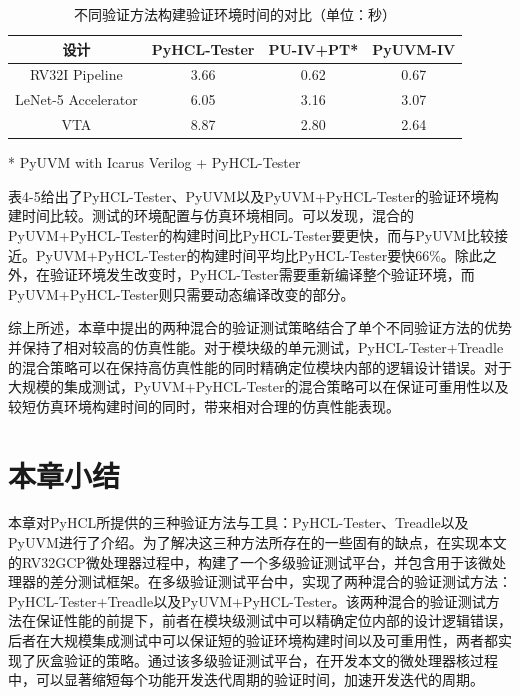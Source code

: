 \begin{table}
	\caption{不同验证方法构建验证环境时间的对比（单位：秒）}
	\centering
	\begin{tabular}{cccc}
		\toprule
		设计 & PyHCL-Tester & PU-IV+PT* & PyUVM-IV \\
		\midrule
		RV32I Pipeline & 3.66  & 0.62 & 0.67  \\
		LeNet-5 Accelerator & 6.05  & 3.16 & 3.07  \\
		VTA   & 8.87  & 2.80 & 2.64  \\
		\bottomrule
	\end{tabular}%
	
	\begin{threeparttable}
		\begin{tablenotes}
			\linespread{1.4}
			\footnotesize
			\item[*] PyUVM with Icarus Verilog + PyHCL-Tester
		\end{tablenotes}
	\end{threeparttable}
\end{table}%

表4-5给出了PyHCL-Tester、PyUVM以及PyUVM+PyHCL-Tester的验证环境构建时间比较。测试的环境配置与仿真环境相同。可以发现，混合的PyUVM+PyHCL-Tester的构建时间比PyHCL-Tester要更快，而与PyUVM比较接近。PyUVM+PyHCL-Tester的构建时间平均比PyHCL-Tester要快66\%。除此之外，在验证环境发生改变时，PyHCL-Tester需要重新编译整个验证环境，而PyUVM+PyHCL-Tester则只需要动态编译改变的部分。

综上所述，本章中提出的两种混合的验证测试策略结合了单个不同验证方法的优势并保持了相对较高的仿真性能。对于模块级的单元测试，PyHCL-Tester+Treadle的混合策略可以在保持高仿真性能的同时精确定位模块内部的逻辑设计错误。对于大规模的集成测试，PyUVM+PyHCL-Tester的混合策略可以在保证可重用性以及较短仿真环境构建时间的同时，带来相对合理的仿真性能表现。

\section{本章小结}

本章对PyHCL所提供的三种验证方法与工具：PyHCL-Tester、Treadle以及PyUVM进行了介绍。为了解决这三种方法所存在的一些固有的缺点，在实现本文的RV32GCP微处理器过程中，构建了一个多级验证测试平台，并包含用于该微处理器的差分测试框架。在多级验证测试平台中，实现了两种混合的验证测试方法：PyHCL-Tester+Treadle以及PyUVM+PyHCL-Tester。该两种混合的验证测试方法在保证性能的前提下，前者在模块级测试中可以精确定位内部的设计逻辑错误，后者在大规模集成测试中可以保证短的验证环境构建时间以及可重用性，两者都实现了灰盒验证的策略。通过该多级验证测试平台，在开发本文的微处理器核过程中，可以显著缩短每个功能开发迭代周期的验证时间，加速开发迭代的周期。